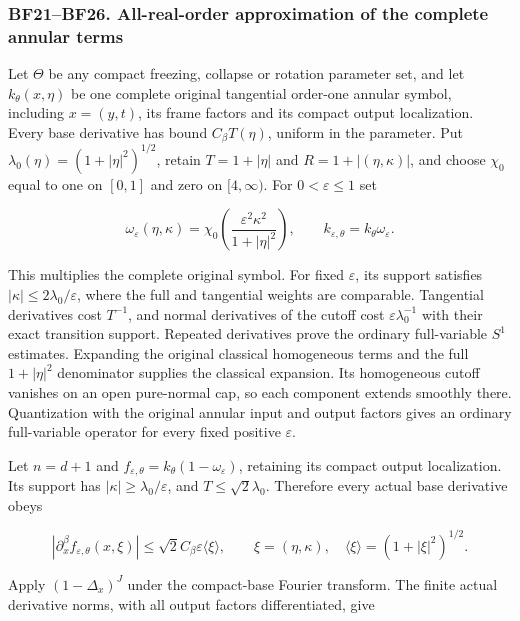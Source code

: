 \documentclass[
  11pt,
]{article}
\begin{document}
\subsubsection{BF21--BF26. All-real-order approximation of the complete
annular
terms}\label{bf21bf26.-all-real-order-approximation-of-the-complete-annular-terms}

Let \(\Theta\) be any compact freezing, collapse or rotation parameter
set, and let \(k_\theta(x,\eta)\) be one complete original tangential
order-one annular symbol, including \(x=(y,t)\), its frame factors and
its compact output localization. Every base derivative has bound
\(C_\beta T(\eta)\), uniform in the parameter. Put
\(\lambda_0(\eta)=(1+|\eta|^2)^{1/2}\), retain \(T=1+|\eta|\) and
\(R=1+|(\eta,\kappa)|\), and choose \(\chi_0\) equal to one on \([0,1]\)
and zero on \([4,\infty)\). For \(0<\varepsilon\le1\) set

\[
 \omega_\varepsilon(\eta,\kappa)
       =\chi_0\left(\frac{\varepsilon^2\kappa^2}{1+|\eta|^2}\right),
 \qquad k_{\varepsilon,\theta}=k_\theta\omega_\varepsilon.
 \tag{BF21}
\]

This multiplies the complete original symbol. For fixed \(\varepsilon\),
its support satisfies \(|\kappa|\le2\lambda_0/\varepsilon\), where the
full and tangential weights are comparable. Tangential derivatives cost
\(T^{-1}\), and normal derivatives of the cutoff cost
\(\varepsilon\lambda_0^{-1}\) with their exact transition support.
Repeated derivatives prove the ordinary full-variable \(S^1\) estimates.
Expanding the original classical homogeneous terms and the full
\(1+|\eta|^2\) denominator supplies the classical expansion. Its
homogeneous cutoff vanishes on an open pure-normal cap, so each
component extends smoothly there. Quantization with the original annular
input and output factors gives an ordinary full-variable operator for
every fixed positive \(\varepsilon\).

Let \(n=d+1\) and
\(f_{\varepsilon,\theta}=k_\theta(1-\omega_\varepsilon)\), retaining its
compact output localization. Its support has
\(|\kappa|\ge\lambda_0/\varepsilon\), and \(T\le\sqrt2\lambda_0\).
Therefore every actual base derivative obeys

\[
 |\partial_x^\beta f_{\varepsilon,\theta}(x,\xi)|
 \le\sqrt2C_\beta\varepsilon\langle\xi\rangle,
 \qquad \xi=(\eta,\kappa),\quad\langle\xi\rangle=(1+|\xi|^2)^{1/2}.
 \tag{BF22}
\]

Apply \((1-\Delta_x)^J\) under the compact-base Fourier transform. The
finite actual derivative norms, with all output factors differentiated,
give
\end{document}
